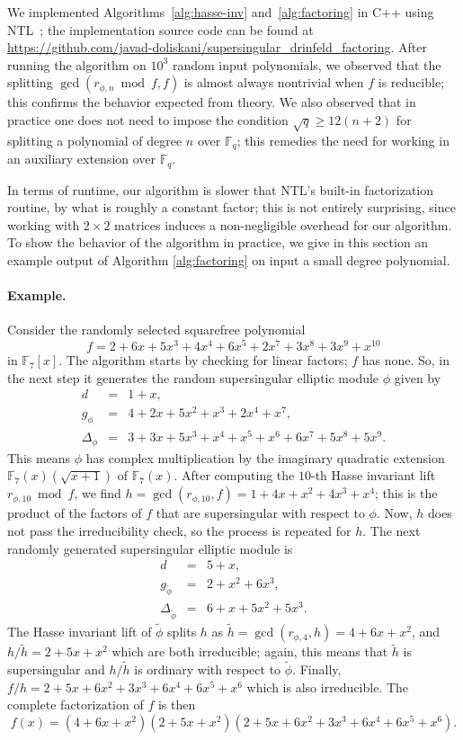 \documentclass[12pt]{article}
\theoremstyle{plain}
\theoremstyle{definition}
\def\F{\ensuremath{\mathbb{F}}}
\begin{document}
We implemented Algorithms~\ref{alg:hasse-inv} and~\ref{alg:factoring}
in C++ using NTL~\cite{shoup2001ntl}; the implementation source code
can be found at
\url{https://github.com/javad-doliskani/supersingular_drinfeld_factoring}. After
running the algorithm on $10^3$ random input polynomials, we observed
that the splitting $\gcd(r_{\phi, n} \bmod f, f)$ is almost always
nontrivial when $f$ is reducible; this confirms the behavior expected
from theory. We also observed that in practice one does not need to
impose the condition $\sqrt{q} \ge 12(n+2)$ for splitting a
polynomial of degree $n$ over $\F_q$; this remedies the need for
working in an auxiliary extension over $\F_q$.

In terms of runtime, our algorithm is slower that NTL's built-in
factorization routine, by what is roughly a constant factor; this is
not entirely surprising, since working with $2\times 2$ matrices
induces a non-negligible overhead for our algorithm. To show the
behavior of the algorithm in practice, we give in this section an
example output of Algorithm \ref{alg:factoring} on input a small
degree polynomial.

\paragraph{Example.}
Consider the randomly selected squarefree polynomial 
\[ f = 2 + 6x + 5x^3 + 4x^4 + 6x^5 + 2x^7 + 3x^8 + 3x^9 + x^{10} \]
in $\F_7[x]$. The algorithm starts by checking for linear factors; $f$ has none. So, in the 
next step it generates the random supersingular elliptic module $\phi$ given by
\[
\begin{array}{rll}
	d & = & 1 + x, \\
	g_\phi & = & 4 + 2x + 5x^2 + x^3 + 2x^4 + x^7, \\
	\Delta_\phi & = & 3 + 3x + 5x^3 + x^4 + x^5 + x^6 + 6x^7 + 5x^8 + 5x^9.
\end{array}
\]
This means $\phi$ has complex multiplication by the imaginary
quadratic extension $\F_7(x)(\sqrt{x + 1})$ of $\F_7(x)$. After
computing the $10$-th Hasse invariant lift $r_{\phi, 10} \bmod f$, we
find $h = \gcd(r_{\phi, 10}, f) = 1 + 4x + x^2 + 4x^3 + x^4$; this is
the product of the factors of $f$ that are supersingular with respect
to $\phi$. Now, $h$ does not pass the irreducibility check, so the
process is repeated for $h$. The next randomly generated supersingular
elliptic module is
\[
\begin{array}{rll}
	d & = & 5 + x, \\
	g_{\tilde \phi} & = & 2 + x^2 + 6x^3, \\
	\Delta_{\tilde\phi} & = & 6 + x + 5x^2 + 5x^3.
\end{array}
\]
The Hasse invariant lift of  $\tilde \phi$ splits $h$ as $
\tilde h = \gcd(r_{\phi, 4}, h) = 4 + 6x + x^2$, and $h/\tilde h = 2
+ 5x + x^2$ which are both irreducible; again, this means that
$\tilde h$ is supersingular and $h/\tilde h$ is ordinary with respect to
$\tilde \phi$. Finally, $f / h = 2 + 5x + 6x^2 + 3x^3 + 6x^4 + 6x^5 + x^6$
which is also irreducible. The complete factorization of $f$ is
then \[ f(x) = (4 + 6x + x^2)(2 + 5x + x^2)(2 + 5x + 6x^2 + 3x^3 +
6x^4 + 6x^5 + x^6).\]



\end{document}
